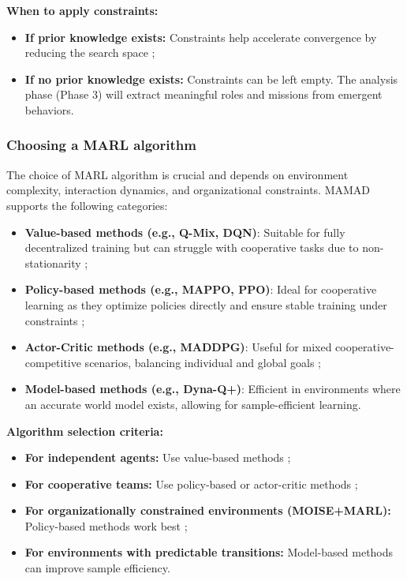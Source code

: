 \documentclass[pdflatex,sn-mathphys-num]{sn-jnl}%
\theoremstyle{thmstyleone}%
\theoremstyle{thmstyletwo}%
\theoremstyle{thmstylethree}%
\begin{document}
\noindent \textbf{When to apply constraints:}
\begin{itemize}
    \item \textbf{If prior knowledge exists:} Constraints help accelerate convergence by reducing the search space ;
    \item \textbf{If no prior knowledge exists:} Constraints can be left empty. The analysis phase (Phase 3) will extract meaningful roles and missions from emergent behaviors.
\end{itemize}

\subsubsection{Choosing a MARL algorithm}
The choice of MARL algorithm is crucial and depends on environment complexity, interaction dynamics, and organizational constraints. MAMAD supports the following categories:

\begin{itemize}
    \item \textbf{Value-based methods (e.g., Q-Mix, DQN)}: Suitable for fully decentralized training but can struggle with cooperative tasks due to non-stationarity ;
    \item \textbf{Policy-based methods (e.g., MAPPO, PPO)}: Ideal for cooperative learning as they optimize policies directly and ensure stable training under constraints ;
    \item \textbf{Actor-Critic methods (e.g., MADDPG)}: Useful for mixed cooperative-competitive scenarios, balancing individual and global goals ;
    \item \textbf{Model-based methods (e.g., Dyna-Q+)}: Efficient in environments where an accurate world model exists, allowing for sample-efficient learning.
\end{itemize}

\noindent \textbf{Algorithm selection criteria:}
\begin{itemize}
    \item \textbf{For independent agents:} Use value-based methods ;
    \item \textbf{For cooperative teams:} Use policy-based or actor-critic methods ;
    \item \textbf{For organizationally constrained environments (MOISE+MARL):} Policy-based methods work best ;
    \item \textbf{For environments with predictable transitions:} Model-based methods can improve sample efficiency.
\end{itemize}
\end{document}

